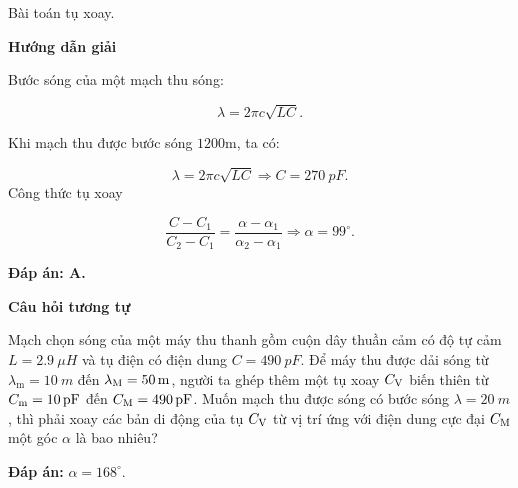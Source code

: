 \begin{dang}{Bài toán tụ xoay.}
	{	\begin{center}
			\textbf{Hướng dẫn giải}
		\end{center}
		
		Bước sóng của một mạch thu sóng:
		
		$$\lambda=2 \pi c \sqrt{L C}.$$
		
		Khi mạch thu được bước sóng $1200 \mathrm{m}$, ta có:
		
		$$\lambda=2 \pi c \sqrt{L C}  \Rightarrow C = \SI{270}{pF}.
		$$
		Công thức tụ xoay
		 
		$$\dfrac{C-C_{1}}{C_{2}-C_{1}}=\dfrac{\alpha-\alpha_{1}}{\alpha_{2}-\alpha_{1}}  \Rightarrow \alpha=99^{\circ}.$$
		
		\textbf{Đáp án: A.}
		
		\begin{center}
			\textbf{Câu hỏi tương tự}
		\end{center}
		
		Mạch chọn sóng của một máy thu thanh gồm cuộn dây thuần cảm có độ tự cảm $L = \SI{2,9}{\mu H}$ và tụ điện có điện dung $C = \SI{490}{pF}$. Để máy thu được dải sóng từ $\lambda_\text{m} = \SI{10}{m}$ đến $\lambda_\text M = \SI{50}{m}$, người ta ghép thêm một tụ xoay $C_\text V$ biến thiên từ $C_\text m = \SI{10}{pF}$ đến $C_\text M = \SI{490}{pF}$. Muốn mạch thu được sóng có bước sóng $\lambda = \SI{20}{m}$, thì phải xoay các bản di động của tụ $C_\text V$ từ vị trí ứng với điện dung cực đại $C_\text M$ một góc $\alpha$ là bao nhiêu?
		
		\textbf{Đáp án:} $\alpha = 168^\circ.$
	}
\end{dang}
